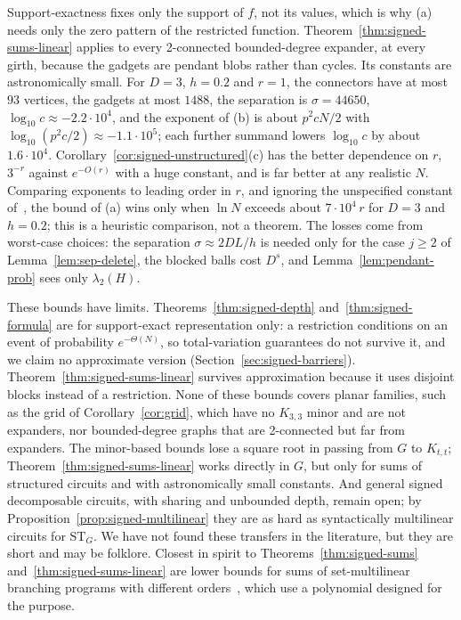 Support-exactness fixes only the support of $f$, not its values, which is why (a) needs only the zero pattern of the restricted function. Theorem~\ref{thm:signed-sums-linear} applies to every 2-connected bounded-degree expander, at every girth, because the gadgets are pendant blobs rather than cycles. Its constants are astronomically small. For $D=3$, $h=0.2$ and $r=1$, the connectors have at most $93$ vertices, the gadgets at most $1488$, the separation is $\sigma=44650$, $\log_{10}c\approx-2.2\cdot10^4$, and the exponent of (b) is about $p^2cN/2$ with $\log_{10}(p^2c/2)\approx-1.1\cdot10^5$; each further summand lowers $\log_{10}c$ by about $1.6\cdot10^4$. Corollary~\ref{cor:signed-unstructured}(c) has the better dependence on $r$, $3^{-r}$ against $e^{-O(r)}$ with a huge constant, and is far better at any realistic $N$. Comparing exponents to leading order in $r$, and ignoring the unspecified constant of~\cite{Krivelevich19}, the bound of (a) wins only when $\ln N$ exceeds about $7\cdot10^4\,r$ for $D=3$ and $h=0.2$; this is a heuristic comparison, not a theorem. The losses come from worst-case choices: the separation $\sigma\approx2DL/h$ is needed only for the case $j\ge2$ of Lemma~\ref{lem:sep-delete}, the blocked balls cost $D^s$, and Lemma~\ref{lem:pendant-prob} sees only $\lambda_2(H)$.

These bounds have limits. Theorems~\ref{thm:signed-depth} and~\ref{thm:signed-formula} are for support-exact representation only: a restriction conditions on an event of probability $e^{-\Theta(N)}$, so total-variation guarantees do not survive it, and we claim no approximate version (Section~\ref{sec:signed-barriers}). Theorem~\ref{thm:signed-sums-linear} survives approximation because it uses disjoint blocks instead of a restriction. None of these bounds covers planar families, such as the grid of Corollary~\ref{cor:grid}, which have no $K_{3,3}$ minor and are not expanders, nor bounded-degree graphs that are 2-connected but far from expanders. The minor-based bounds lose a square root in passing from $G$ to $K_{t,t}$; Theorem~\ref{thm:signed-sums-linear} works directly in $G$, but only for sums of structured circuits and with astronomically small constants. And general signed decomposable circuits, with sharing and unbounded depth, remain open; by Proposition~\ref{prop:signed-multilinear} they are as hard as syntactically multilinear circuits for $\mathrm{ST}_G$. We have not found these transfers in the literature, but they are short and may be folklore. Closest in spirit to Theorems~\ref{thm:signed-sums} and~\ref{thm:signed-sums-linear} are lower bounds for sums of set-multilinear branching programs with different orders~\cite{ChatterjeeKushSarafShpilka24}, which use a polynomial designed for the purpose.

